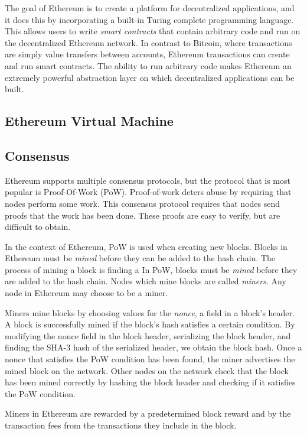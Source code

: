 \documentclass[12pt]{article}
\begin{document}

The goal of Ethereum is to create a platform for decentralized applications, and it does this by incorporating a built-in Turing complete programming language. This allows users to write \emph{smart contracts} that contain arbitrary code and run on the decentralized Ethereum network. In contrast to Bitcoin, where transactions are simply value transfers between accounts, Ethereum transactions can create and run smart contracts. The ability to run arbitrary code makes Ethereum an extremely powerful abstraction layer on which decentralized applications can be built.

\subsection{Ethereum Virtual Machine}


\subsection{Consensus}
Ethereum supports multiple consensus protocols, but the protocol that is most popular is Proof-Of-Work (PoW). Proof-of-work deters abuse by requiring that nodes perform some work. This consensus protocol requires that nodes send proofs that the work has been done. These proofs are easy to verify, but are difficult to obtain.

In the context of Ethereum, PoW is used when creating new blocks. Blocks in Ethereum must be \emph{mined} before they can be added to the hash chain. The process of mining a block is finding a
In PoW, blocks must be \emph{mined} before they are added to the hash chain. Nodes which mine blocks are called \emph{miners}. Any node in Ethereum may choose to be a miner.

Miners mine blocks by choosing values for the \emph{nonce}, a field in a block's header. A block is successfully mined if the block's hash satisfies a certain condition. By modifying the nonce field in the block header, serializing the block header, and finding the SHA-3 hash of the serialized header, we obtain the block hash. Once a nonce that satisfies the PoW condition has been found, the miner advertises the mined block on the network. Other nodes on the network check that the block has been mined correctly by hashing the block header and checking if it satisfies the PoW condition.

Miners in Ethereum are rewarded by a predetermined block reward and by the transaction fees from the transactions they include in the block.
\end{document}
